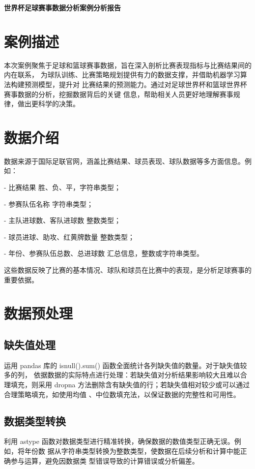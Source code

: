\documentclass[UTF8]{ctexart}
\author{}
\date{}
\begin{document}
	
	\thispagestyle{empty}
	
	\begin{center}
		 \bfseries 世界杯足球赛事数据分析案例分析报告 \\
	\end{center}
	
	\vspace{12pt}
	
	\section*{案例描述}
	本次案例聚焦于足球和篮球赛事数据，旨在深入剖析比赛表现指标与比赛结果间的内在联系，
	为球队训练、比赛策略规划提供有力的数据支撑，并借助机器学习算法构建预测模型，提升对
	比赛结果的预测能力。通过对足球世界杯和篮球世界杯赛事数据的分析，挖掘数据背后的关键
	信息，帮助相关人员更好地理解赛事规律，做出更科学的决策。
	
	\section*{数据介绍}
	数据来源于国际足联官网，涵盖比赛结果、球员表现、球队数据等多方面信息。例如：
	
	
	- 比赛结果 胜、负、平，字符串类型；
	
	- 参赛队伍名称 字符串类型；
	
	- 主队进球数、客队进球数 整数类型；
	
	- 球员进球、助攻、红黄牌数量 整数类型；
	
	- 年份、参赛队伍总数、总进球数 汇总信息，整数或字符串类型。
	
	
	这些数据反映了比赛的基本情况、球队和球员在比赛中的表现，是分析足球赛事的重要依据。
	
	\section*{数据预处理}
	
	\subsection*{缺失值处理}
	运用 pandas 库的 isnull().sum() 函数全面统计各列缺失值的数量。对于缺失值较多的列，
	依据数据的实际特点进行处理：若缺失值对分析结果影响较大且难以合理填充，则采用
	dropna 方法删除含有缺失值的行；若缺失值相对较少或可以通过合理策略填充，如使用均值
	、中位数填充法，以保证数据的完整性和可用性。
	
	\subsection*{数据类型转换}
	利用 astype 函数对数据类型进行精准转换，确保数据的数值类型正确无误。例如，将年份数
	据从字符串类型转换为整数类型，使数据在后续分析和计算中能正确参与运算，避免因数据类
	型错误导致的计算错误或分析偏差。
	
\end{document}
